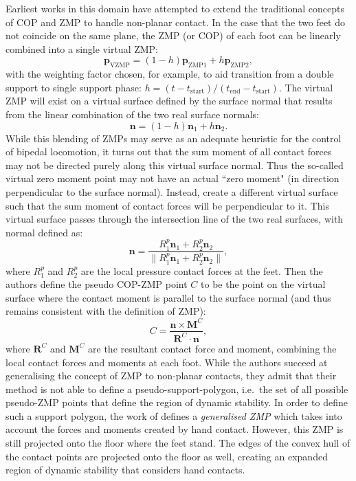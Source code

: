 \documentclass[12pt,a4paper,twoside]{article}
\newcommand{\vvc}[1]{{\bm{#1}}}
\newcommand{\p}{\vvc{p}}
\begin{document}
Earliest works in this domain have attempted to extend the traditional concepts of COP and ZMP to handle non-planar contact. In the case that the two feet do not coincide on the same plane, the ZMP (or COP) of each foot can be linearly combined into a single virtual ZMP\cite{takenaka1999gait}: 
\begin{equation}
\p_\text{VZMP} = (1-h)\p_\text{ZMP1}+h\p_\text{ZMP2},
\end{equation}
with the weighting factor chosen, for example, to aid transition from a double support to single support phase: $h = (t-t_\text{start})/(t_\text{end} - t_\text{start})$. The virtual ZMP will exist on a virtual surface defined by  the surface normal that results from the linear combination of the two real surface normals:
\begin{equation}
\vvc{n} = (1-h)\vvc{n}_1 + h\vvc{n}_2.
\end{equation} 
While this blending of ZMPs may serve as an adequate heuristic for the control of bipedal locomotion, it turns out that the sum moment of all contact forces may not be directed purely along this virtual surface normal. Thus the so-called virtual zero moment point may not have an actual ``zero moment" (in direction perpendicular to the surface normal).  Instead, \cite{Sardain2004} create a different virtual surface such that the sum moment of contact forces will be perpendicular to it. This virtual surface passes through the intersection line of the two real surfaces, with normal defined as:
\begin{equation}
\vvc{n} = \frac{R_1^p\vvc{n}_1 + R_2^p\vvc{n}_2}{\|R_1^p\vvc{n}_1 + R_2^p\vvc{n}_2\|},
\end{equation}
where $R_1^p$ and $R_2^p$ are the local pressure contact forces at the feet. Then the authors define the pseudo COP-ZMP point $C$ to be the point on the virtual surface where the contact moment is parallel to the surface normal (and thus remains consistent with the definition of ZMP):
\begin{equation}
C=\frac{\vvc{n} \times \vvc{M}^C}{\vvc{R}^C \cdot \vvc{n}},
\end{equation}
where $\vvc{R}^C$ and $\vvc{M}^C$ are the resultant contact force and moment, combining the local contact forces and moments at each foot. While the authors succeed at generalising the concept of ZMP to non-planar contacts, they admit that their method is not able to define a pseudo-support-polygon, i.e.\ the set of all possible pseudo-ZMP points that define the region of dynamic stability.  In order to define such a support polygon, the work of \cite{Harada2003} defines a \emph{generalised ZMP} which takes into account the forces and moments created by hand contact. However, this ZMP is still projected onto the floor where the feet stand.  The edges of the convex hull of the contact points are projected onto the floor as well, creating an expanded region of dynamic stability that considers hand contacts. 
\end{document}
